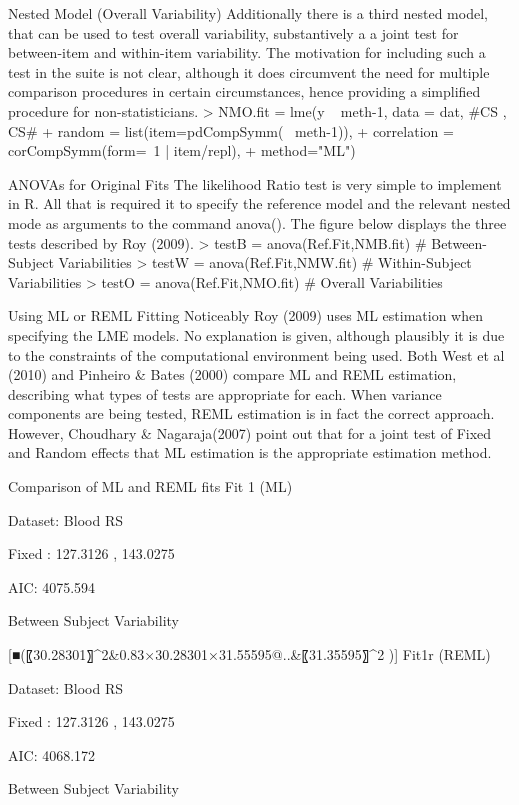 Nested Model (Overall Variability)
Additionally there is a third nested model, that can be used to test overall variability, substantively a a joint test for between-item and within-item variability. The motivation for including such a test in the suite is not clear, although it does circumvent the need for multiple comparison procedures in certain circumstances, hence providing a simplified procedure for non-statisticians.
> NMO.fit = lme(y ~ meth-1, data = dat,   #CS , CS# 
+     random = list(item=pdCompSymm(~ meth-1)), 
+     correlation = corCompSymm(form=~1 | item/repl), 
+     method="ML")


ANOVAs  for  Original Fits
The likelihood Ratio test is very simple to implement in R. All that is required it to specify the reference model and the relevant nested mode as arguments to the command anova().
The figure below displays the three tests described by Roy (2009).
> testB    = anova(Ref.Fit,NMB.fit)                          # Between-Subject Variabilities
> testW   = anova(Ref.Fit,NMW.fit)                        # Within-Subject Variabilities
> testO     = anova(Ref.Fit,NMO.fit)                        # Overall Variabilities



Using ML or REML Fitting
Noticeably Roy (2009) uses ML estimation when specifying the LME models. No explanation is given, although plausibly it is due to the constraints of the computational environment being used.
Both West et al (2010) and Pinheiro & Bates (2000) compare ML and REML estimation, describing what types of tests are appropriate for each.  When variance components are being tested, REML estimation is in fact the correct approach. 
However, Choudhary & Nagaraja(2007) point out  that for a joint test of Fixed and Random effects that ML estimation is the appropriate estimation method.


Comparison of ML and REML fits
Fit 1 (ML)

Dataset: Blood RS

Fixed : 127.3126 , 143.0275

AIC: 4075.594

Between Subject Variability

[■(〖30.28301〗^2&0.83×30.28301×31.55595@..&〖31.35595〗^2 )]	Fit1r (REML)

Dataset: Blood RS

Fixed : 127.3126 , 143.0275

AIC: 4068.172

Between Subject Variability

